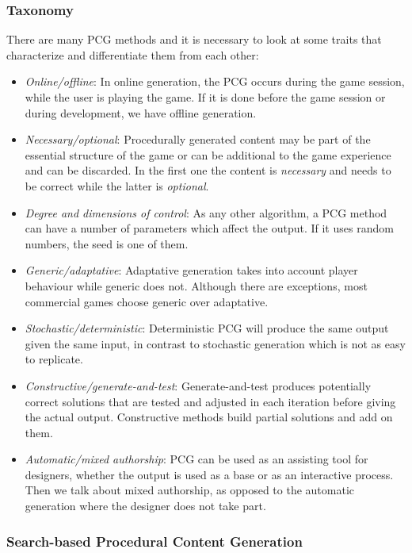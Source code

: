 \subsubsection{Taxonomy}
There are many PCG methods and it is necessary to look at some traits that characterize and differentiate them from each other: \cite{togelius2016introduction}

\begin{itemize}
	\item \textit{Online/offline}: In online generation, the PCG occurs during the game session, while the user is playing the game. If it is done before the game session or during development, we have offline generation. 
	\item \textit{Necessary/optional}: Procedurally generated content may be part of the essential structure of the game or can be additional to the game experience and can be discarded. In the first one the content is \textit{necessary} and needs to be correct while the latter is \textit{optional}.
	\item \textit{Degree and dimensions of control}: As any other algorithm, a PCG method can have a number of parameters which affect the output. If it uses random numbers, the seed is one of them.
	\item \textit{Generic/adaptative}: Adaptative generation takes into account player behaviour while generic does not. Although there are exceptions, most commercial games choose generic over adaptative.
	\item \textit{Stochastic/deterministic}: Deterministic PCG will produce the same output given the same input, in contrast to stochastic generation which is not as easy to replicate. 
	\item \textit{Constructive/generate-and-test}: Generate-and-test produces potentially correct solutions that are tested and adjusted in each iteration before giving the actual output. Constructive methods build partial solutions and add on them.
	\item \textit{Automatic/mixed authorship}: PCG can be used as an assisting tool for designers, whether the output is used as a base or as an interactive process. Then we talk about mixed authorship, as opposed to the automatic generation where the designer does not take part. 
\end{itemize}

\subsubsection{Search-based Procedural Content Generation}

